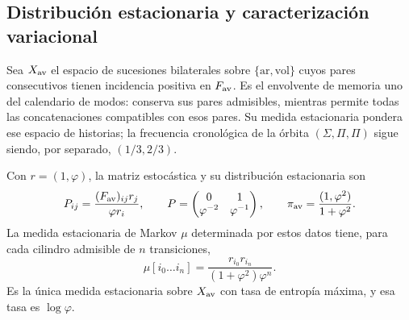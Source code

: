 \subsection{Distribución estacionaria y caracterización variacional}
\label{v:v:subsec:parry-explicita}

Sea \(X_{\rm av}\) el espacio de sucesiones bilaterales sobre
\(\{\mathrm{ar},\mathrm{vol}\}\) cuyos pares consecutivos tienen
incidencia positiva en \(F_{\rm av}\). Es el envolvente de memoria uno
del calendario de modos: conserva sus pares admisibles, mientras permite
todas las concatenaciones compatibles con esos pares. Su medida
estacionaria pondera ese espacio de historias; la frecuencia cronológica
de la órbita \((\Sigma,\Pi,\Pi)\) sigue siendo, por separado,
\((1/3,2/3)\).

\begin{proposition}
\label{v:v:prop:parry-explicita}
Con \(r=(1,\varphi)\), la matriz estocástica y su distribución
estacionaria son
\begin{equation}
 P_{ij}=\frac{(F_{\rm av})_{ij}r_j}{\varphi r_i},\qquad
 P=\begin{pmatrix}0&1\\\varphi^{-2}&\varphi^{-1}\end{pmatrix},
 \qquad
 \pi_{\rm av}=\frac{(1,\varphi^2)}{1+\varphi^2}.
 \label{v:v:eq:parry-transicion-estacionaria}
\end{equation}
La medida estacionaria de Markov \(\mu\) determinada por estos datos
tiene, para cada cilindro admisible de \(n\) transiciones,
\begin{equation}
 \mu[i_0\ldots i_n]
 =\frac{r_{i_0}r_{i_n}}{(1+\varphi^2)\varphi^n}.
 \label{v:v:eq:parry-cilindros}
\end{equation}
Es la única medida estacionaria sobre \(X_{\rm av}\) con tasa de
entropía máxima, y esa tasa es \(\log\varphi\).
\end{proposition}

